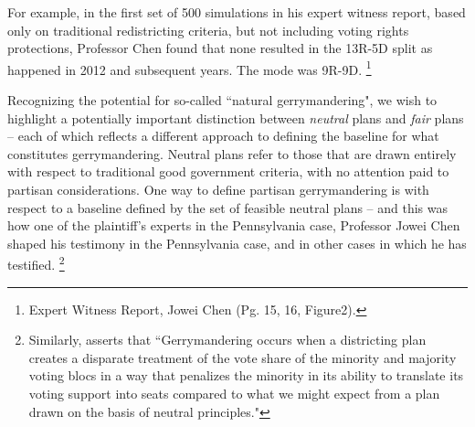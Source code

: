     For example, in the first set of 500 simulations in his expert witness report, based only on traditional redistricting criteria, but not including voting rights protections, Professor Chen found that none resulted in the 13R-5D split as happened in 2012 and subsequent years. The mode was 9R-9D.  
    \footnote{Expert Witness Report, Jowei Chen (Pg. 15, 16, Figure2).}
\par
    Recognizing the potential for so-called ``natural gerrymandering", we wish to highlight a potentially important distinction between \textit{neutral} plans and \textit{fair} plans -- each of which reflects a different approach to defining the baseline for what constitutes gerrymandering. Neutral plans refer to those that are drawn entirely with respect to traditional good government criteria, with no attention paid to partisan considerations. One way to define partisan gerrymandering is with respect to a baseline defined by the set of feasible neutral plans -- and this was how one of the plaintiff’s experts in the Pennsylvania case, Professor Jowei Chen \citep[cf.][]{Chen2013} shaped his testimony in the Pennsylvania case, and in other cases in which he has testified.
    \footnote{Similarly, \citet{Grofman2018_ELJ} asserts that ``Gerrymandering occurs when a districting plan creates a disparate treatment of the vote share of the minority and majority voting blocs in a way that penalizes the minority in its ability to translate its voting support into seats compared to what we might expect from a plan drawn on the basis of neutral principles."}
